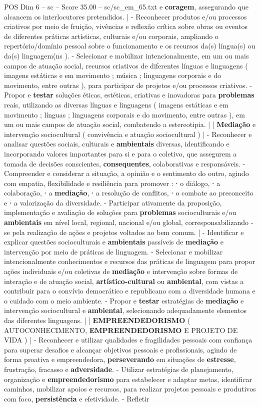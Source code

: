 \begin{textsample}{POS Dim 6 – sc – Score 35.00 – sc/sc\_em\_65.txt}
e \textbf{coragem}, assegurando que alcancem os interlocutores pretendidos. | - Reconhecer produtos e/ou processos criativos por meio de fruição, vivências e reflexão crítica sobre obras ou eventos de diferentes práticas artísticas, culturais e/ou corporais, ampliando o repertório/domínio pessoal sobre o funcionamento e os recursos da(s) língua(s) ou da(s) linguagem(ns ). - Selecionar e mobilizar intencionalmente, em um ou mais campos de atuação social, recursos criativos de diferentes línguas e linguagens ( imagens estáticas e em movimento ; música ; linguagens corporais e do movimento, entre outras ), para participar de projetos e/ou processos criativos. - Propor e \textbf{testar} soluções éticas, estéticas, criativas e inovadoras para \textbf{problemas} reais, utilizando as diversas línguas e linguagens ( imagens estáticas e em movimento ; línguas ; linguagens corporais e do movimento, entre outras ), em um ou mais campos de atuação social, combatendo a estereotipia. | | \textbf{Mediação} e intervenção sociocultural ( convivência e atuação sociocultural ) | - Reconhecer e analisar questões sociais, culturais e \textbf{ambientais} diversas, identificando e incorporando valores importantes para si e para o coletivo, que assegurem a tomada de decisões conscientes, \textbf{consequentes}, colaborativas e responsáveis. - Compreender e considerar a situação, a opinião e o sentimento do outro, agindo com empatia, flexibilidade e resiliência para promover : ⋅ o diálogo, ⋅ a colaboração, ⋅ a \textbf{mediação}, ⋅ a resolução de conflitos, ⋅ o combate ao preconceito e ⋅ a valorização da diversidade. - Participar ativamente da proposição, implementação e avaliação de soluções para \textbf{problemas} socioculturais e/ou \textbf{ambientais} em nível local, regional, nacional e/ou global, corresponsabilizando -se pela realização de ações e projetos voltados ao bem comum. | - Identificar e explicar questões socioculturais e \textbf{ambientais} passíveis de \textbf{mediação} e intervenção por meio de práticas de linguagem. - Selecionar e mobilizar intencionalmente conhecimentos e recursos das práticas de linguagem para propor ações individuais e/ou coletivas de \textbf{mediação} e intervenção sobre formas de interação e de atuação social, \textbf{artístico-cultural} ou \textbf{ambiental}, com vistas a contribuir para o convívio democrático e republicano com a diversidade humana e o cuidado com o meio ambiente. - Propor e \textbf{testar} estratégias de \textbf{mediação} e intervenção sociocultural e \textbf{ambiental}, selecionando adequadamente elementos das diferentes linguagens. | | \textbf{EMPREENDEDORISMO} ( AUTOCONHECIMENTO, \textbf{EMPREENDEDORISMO} E PROJETO DE VIDA ) | - Reconhecer e utilizar qualidades e fragilidades pessoais com confiança para superar desafios e alcançar objetivos pessoais e profissionais, agindo de forma proativa e empreendedora, \textbf{perseverando} em situações de \textbf{estresse}, frustração, fracasso e \textbf{adversidade}. - Utilizar estratégias de planejamento, organização e \textbf{empreendedorismo} para estabelecer e adaptar metas, identificar caminhos, mobilizar apoios e recursos, para realizar projetos pessoais e produtivos com foco, \textbf{persistência} e efetividade. - Refletir 
\end{textsample}
